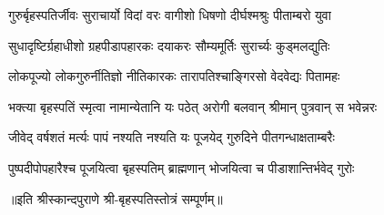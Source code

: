 

\twolineshloka
{गुरुर्बृहस्पतिर्जीवः सुराचार्यो विदां वरः}
{वागीशो धिषणो दीर्घश्मश्रुः पीताम्बरो युवा}

\twolineshloka
{सुधादृष्टिर्ग्रहाधीशो ग्रहपीडापहारकः}
{दयाकरः सौम्यमूर्तिः सुरार्च्यः कुड्मलद्युतिः}

\twolineshloka
{लोकपूज्यो लोकगुरुर्नीतिज्ञो नीतिकारकः}
{तारापतिश्चाङ्गिरसो वेदवेद्यः पितामहः}

\twolineshloka
{भक्त्या बृहस्पतिं स्मृत्वा नामान्येतानि यः पठेत्}
{अरोगी बलवान् श्रीमान् पुत्रवान् स भवेन्नरः}

\twolineshloka
{जीवेद् वर्षशतं मर्त्यः पापं नश्यति नश्यति}
{यः पूजयेद् गुरुदिने पीतगन्धाक्षताम्बरैः}

\twolineshloka
{पुष्पदीपोपहारैश्च पूजयित्वा बृहस्पतिम्}
{ब्राह्मणान् भोजयित्वा च पीडाशान्तिर्भवेद् गुरोः}

॥इति श्रीस्कान्दपुराणे श्री-बृहस्पतिस्तोत्रं सम्पूर्णम्॥

